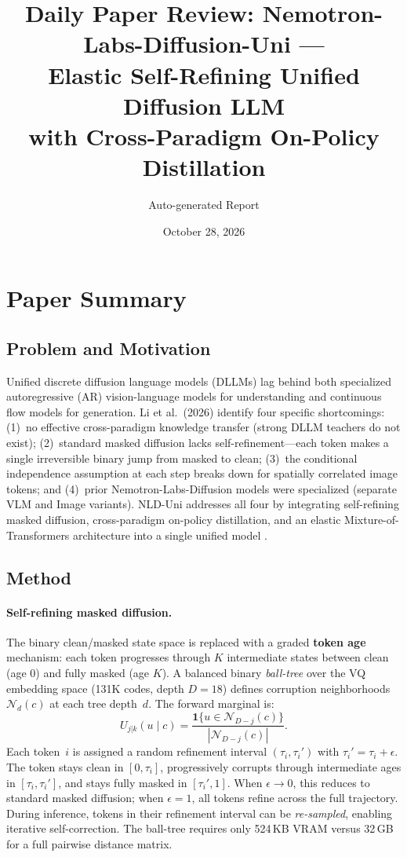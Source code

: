 \documentclass[11pt,a4paper]{article}
\title{Daily Paper Review: Nemotron-Labs-Diffusion-Uni ---\\Elastic Self-Refining Unified Diffusion LLM\\with Cross-Paradigm On-Policy Distillation}
\author{Auto-generated Report}
\date{October 28, 2026}
\begin{document}
\maketitle

\section{Paper Summary}

\subsection{Problem and Motivation}
Unified discrete diffusion language models (DLLMs) lag behind both specialized autoregressive (AR) vision-language models for understanding and continuous flow models for generation. Li et al.\ (2026) identify four specific shortcomings: (1)~no effective cross-paradigm knowledge transfer (strong DLLM teachers do not exist); (2)~standard masked diffusion lacks self-refinement---each token makes a single irreversible binary jump from masked to clean; (3)~the conditional independence assumption at each step breaks down for spatially correlated image tokens; and (4)~prior Nemotron-Labs-Diffusion models were specialized (separate VLM and Image variants). NLD-Uni addresses all four by integrating self-refining masked diffusion, cross-paradigm on-policy distillation, and an elastic Mixture-of-Transformers architecture into a single unified model \cite{li2026nlduni}.

\subsection{Method}

\paragraph{Self-refining masked diffusion.} The binary clean/masked state space is replaced with a graded \textbf{token age} mechanism: each token progresses through $K$ intermediate states between clean (age 0) and fully masked (age $K$). A balanced binary \emph{ball-tree} over the VQ embedding space (131K codes, depth $D=18$) defines corruption neighborhoods $\mathcal{N}_d(c)$ at each tree depth~$d$. The forward marginal is:
\begin{equation}
  U_{j|k}(u \mid c) = \frac{\mathbf{1}\{u \in \mathcal{N}_{D-j}(c)\}}{|\mathcal{N}_{D-j}(c)|}.
\end{equation}
Each token~$i$ is assigned a random refinement interval $(\tau_i, \tau_i')$ with $\tau_i' = \tau_i + \epsilon$. The token stays clean in $[0, \tau_i]$, progressively corrupts through intermediate ages in $[\tau_i, \tau_i']$, and stays fully masked in $[\tau_i', 1]$. When $\epsilon \to 0$, this reduces to standard masked diffusion; when $\epsilon = 1$, all tokens refine across the full trajectory. During inference, tokens in their refinement interval can be \emph{re-sampled}, enabling iterative self-correction. The ball-tree requires only 524\,KB VRAM versus 32\,GB for a full pairwise distance matrix.
\end{document}
